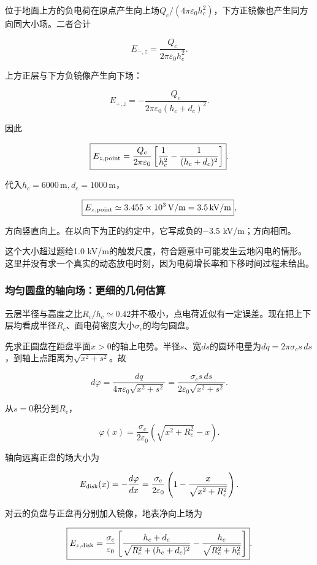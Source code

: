 \documentclass[12pt,a4paper,fontset=fandol]{ctexart}
\begin{document}
位于地面上方的负电荷在原点产生向上场\(Q_c/(4\pi\varepsilon_0h_c^2)\)，下方正镜像也产生同方向同大小场。二者合计

\[
E_{-,z}=\frac{Q_c}{2\pi\varepsilon_0h_c^2}.
\]

上方正层与下方负镜像产生向下场：

\[
E_{+,z}=-\frac{Q_c}
{2\pi\varepsilon_0(h_c+d_c)^2}.
\]

因此

\[
\boxed{
E_{z,\rm point}
=\frac{Q_c}{2\pi\varepsilon_0}
\left[\frac1{h_c^2}
-\frac1{(h_c+d_c)^2}\right]}.
\]

代入\(h_c=6000\,\mathrm m,d_c=1000\,\mathrm m\)，

\[
\boxed{E_{z,\rm point}\simeq
3.455\times10^3\,\mathrm{V/m}
=3.5\,\mathrm{kV/m}},
\]

方向竖直向上。在以向下为正的约定中，它写成负的−3.5 kV/m；方向相同。

这个大小超过题给1.0
kV/m的触发尺度，符合题意中可能发生云地闪电的情形。这里并没有求一个真实的动态放电时刻，因为电荷增长率和下移时间过程未给出。

\subsubsection{均匀圆盘的轴向场：更细的几何估算}\label{ux5747ux5300ux5706ux76d8ux7684ux8f74ux5411ux573aux66f4ux7ec6ux7684ux51e0ux4f55ux4f30ux7b97}

云层半径与高度之比\(R_c/h_c\simeq0.42\)并不极小，点电荷近似有一定误差。现在把上下层均看成半径\(R_c\)、面电荷密度大小\(\sigma_c\)的均匀圆盘。

先求正圆盘在距盘平面\(x>0\)的轴上电势。半径\(s\)、宽\(ds\)的圆环电量为\(dq=2\pi\sigma_cs\,ds\)，到轴上点距离为\(\sqrt{x^2+s^2}\)。故

\[
d\varphi=\frac{dq}
{4\pi\varepsilon_0\sqrt{x^2+s^2}}
=\frac{\sigma_c s\,ds}
{2\varepsilon_0\sqrt{x^2+s^2}}.
\]

从\(s=0\)积分到\(R_c\)，

\[
\varphi(x)=
\frac{\sigma_c}{2\varepsilon_0}
\left(\sqrt{x^2+R_c^2}-x\right).
\]

轴向远离正盘的场大小为

\[
E_{\rm disk}(x)
=-\frac{d\varphi}{dx}
=\frac{\sigma_c}{2\varepsilon_0}
\left(1-\frac{x}{\sqrt{x^2+R_c^2}}\right).
\]

对云的负盘与正盘再分别加入镜像，地表净向上场为

\[
\boxed{
E_{z,\rm disk}
=\frac{\sigma_c}{\varepsilon_0}
\left[
\frac{h_c+d_c}{\sqrt{R_c^2+(h_c+d_c)^2}}
-\frac{h_c}{\sqrt{R_c^2+h_c^2}}
\right]}.
\]
\end{document}
